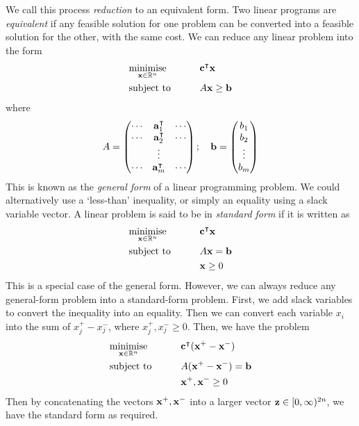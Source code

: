 We call this process \textit{reduction} to an equivalent form.
Two linear programs are \textit{equivalent} if any feasible solution for one problem can be converted into a feasible solution for the other, with the same cost.
We can reduce any linear problem into the form
\begin{alignat*}{2}
	 & \underset{\vb x \in \mathbb R^n}{\text{minimise}} & \qquad & \vb c^\intercal \vb x \\
	 & \text{subject to}                                 &        & A\vb x \geq \vb b      \\
\end{alignat*}
where
\[
	A = \begin{pmatrix}
		\cdots & \vb a_1^\intercal & \cdots \\
		\cdots & \vb a_2^\intercal & \cdots \\
		       & \vdots             &        \\
		\cdots & \vb a_m^\intercal & \cdots
	\end{pmatrix};\quad \vb b = \begin{pmatrix}
		b_1 \\ b_2 \\ \vdots \\ b_m
	\end{pmatrix}
\]
This is known as the \textit{general form} of a linear programming problem.
We could alternatively use a `less-than' inequality, or simply an equality using a slack variable vector.
A linear problem is said to be in \textit{standard form} if it is written as
\begin{alignat*}{2}
	 & \underset{\vb x \in \mathbb R^n}{\text{minimise}} & \qquad & \vb c^\intercal \vb x \\
	 & \text{subject to}                                 &        & A\vb x = \vb b         \\
	 &                                                   &        & \vb x \geq 0
\end{alignat*}
This is a special case of the general form.
However, we can always reduce any general-form problem into a standard-form problem.
First, we add slack variables to convert the inequality into an equality.
Then we can convert each variable \( x_i \) into the sum of \( x_j^+ - x_j^- \), where \( x_j^+, x_j^- \geq 0 \).
Then, we have the problem
\begin{alignat*}{2}
	 & \underset{\vb x \in \mathbb R^n}{\text{minimise}} & \qquad & \vb c^\intercal (\vb x^+ - \vb x^-) \\
	 & \text{subject to}                                 &        & A (\vb x^+ - \vb x^-) = \vb b        \\
	 &                                                   &        & \vb x^+, \vb x^- \geq 0
\end{alignat*}
Then by concatenating the vectors \( \vb x^+, \vb x^- \) into a larger vector \( \vb z \in [0, \infty)^{2n} \), we have the standard form as required.

